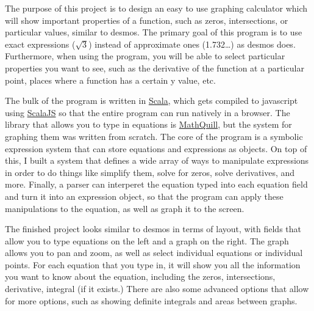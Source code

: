 \documentclass[11pt]{article}
\date{\today}
\title{}
\begin{document}
The purpose of this project is to design an easy to use graphing calculator which will show important properties of a function, such as zeros, intersections, or particular values, similar to desmos. The primary goal of this program is to use exact expressions (\(\sqrt{3}\)) instead of approximate ones (1.732\ldots{}) as desmos does. Furthermore, when using the program, you will be able to select particular properties you want to see, such as the derivative of the function at a particular point, places where a function has a certain y value, etc.

The bulk of the program is written in \href{https://scala-lang.org/}{Scala}, which gets compiled to javascript using \href{https://www.scala-js.org/}{ScalaJS} so that the entire program can run natively in a browser. The library that allows you to type in equations is \href{http://mathquill.com/}{MathQuill}, but the system for graphing them was written from scratch.
The core of the program is a symbolic expression system that can store equations and expressions as objects. On top of this, I built a system that defines a wide array of ways to manipulate expressions in order to do things like simplify them, solve for zeros, solve derivatives, and more. Finally, a parser can interperet the equation typed into each equation field and turn it into an expression object, so that the program can apply these manipulations to the equation, as well as graph it to the screen.

The finished project looks similar to desmos in terms of layout, with fields that allow you to type equations on the left and a graph on the right. The graph allows you to pan and zoom, as well as select individual equations or individual points. For each equation that you type in, it will show you all the information you want to know about the equation, including the zeros, intersections, derivative, integral (if it exists.) There are also some advanced options that allow for more options, such as showing definite integrals and areas between graphs.
\end{document}
